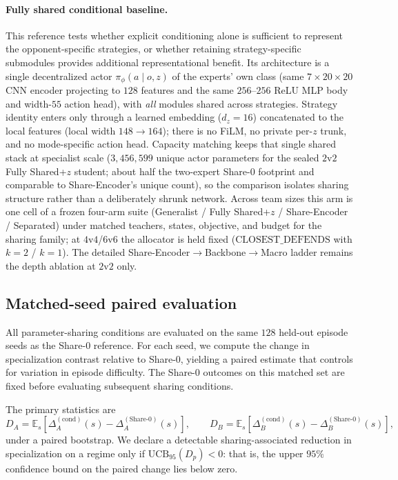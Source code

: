 \documentclass{article}
\begin{document}
\paragraph{Fully shared conditional baseline.}
This reference tests whether explicit conditioning alone is sufficient to
represent the opponent-specific strategies, or whether retaining
strategy-specific submodules provides additional representational benefit.
Its architecture is a single decentralized actor $\pi_\phi(a\mid o,z)$ of the
experts' own class (same $7{\times}20{\times}20$ CNN encoder projecting to $128$
features and the same $256$--$256$ ReLU MLP body and width-$55$ action head),
with \emph{all} modules shared across strategies.
Strategy identity enters only through a learned embedding
($d_z{=}16$) concatenated to the local features
(local width $148\!\to\!164$); there is no FiLM, no private per-$z$ trunk, and no
mode-specific action head.
Capacity matching keeps that single shared stack at specialist scale
($3{,}456{,}599$ unique actor parameters for the sealed $2$v$2$ Fully Shared+$z$
student; about half the two-expert Share-0 footprint and comparable to
Share-Encoder's unique count), so the comparison isolates sharing structure
rather than a deliberately shrunk network.
Across team sizes this arm is one cell of a frozen four-arm suite
(Generalist / Fully Shared+$z$ / Share-Encoder / Separated) under matched
teachers, states, objective, and budget for the sharing family; at $4$v$4$/$6$v$6$
the allocator is held fixed ($\mathrm{CLOSEST\_DEFENDS}$ with $k{=}2$ / $k{=}1$).
The detailed Share-Encoder$\rightarrow$Backbone$\rightarrow$Macro ladder remains the
depth ablation at $2$v$2$ only.

\subsection{Matched-seed paired evaluation}
\label{sec:matched}

All parameter-sharing conditions are evaluated on the same $128$ held-out
episode seeds as the Share-0 reference. For each seed, we compute the change in
specialization contrast relative to Share-0, yielding a paired estimate that
controls for variation in episode difficulty. The Share-0 outcomes on this
matched set are fixed before evaluating subsequent sharing conditions.

The primary statistics are
\[
D_A=\mathbb{E}_s\!\left[\Delta_A^{\mathrm{(cond)}}(s)-\Delta_A^{\mathrm{(Share\textrm{-}0)}}(s)\right],
\qquad
D_B=\mathbb{E}_s\!\left[\Delta_B^{\mathrm{(cond)}}(s)-\Delta_B^{\mathrm{(Share\textrm{-}0)}}(s)\right],
\]
under a paired bootstrap. We declare a detectable sharing-associated reduction
in specialization on a regime only if $\mathrm{UCB}_{95}(D_p)<0$: that is, the
upper $95\%$ confidence bound on the paired change lies below zero.
\end{document}
